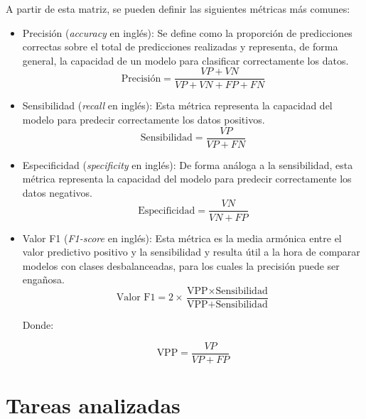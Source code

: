 A partir de esta matriz, se pueden definir las siguientes métricas más comunes:

\begin{itemize}
	\item Precisión (\textit{accuracy} en inglés): Se define como la proporción de predicciones correctas sobre el total de predicciones realizadas
	      y representa, de forma general, la capacidad de un modelo para clasificar correctamente los datos.
	      \begin{equation}
		      \label{eq:accuracy}
		      \text{Precisión} = \frac{VP + VN}{VP + VN + FP + FN}
	      \end{equation}

	\item Sensibilidad (\textit{recall} en inglés): Esta métrica representa la capacidad del modelo para predecir correctamente los datos positivos.
	      \begin{equation}
		      \label{eq:recall}
		      \text{Sensibilidad} = \frac{VP}{VP + FN}
	      \end{equation}

	\item Especificidad (\textit{specificity} en inglés): De forma análoga a la sensibilidad, esta métrica representa la capacidad del
	      modelo para predecir correctamente los datos negativos.
	      \begin{equation}
		      \label{eq:specificity}
		      \text{Especificidad} = \frac{VN}{VN + FP}
	      \end{equation}

	\item Valor F1 (\textit{F1-score} en inglés): Esta métrica es la media armónica entre el valor predictivo positivo y la sensibilidad
	      y resulta útil a la hora de comparar modelos con clases desbalanceadas, para los cuales la precisión puede ser engañosa.
	      \begin{equation}
		      \label{eq:f1}
		      \text{Valor F1} = 2 \times \frac{\text{VPP} \times \text{Sensibilidad}}{\text{VPP} + \text{Sensibilidad}}
	      \end{equation}

				Donde:

				\begin{equation}
					\label{eq:vpp}
					\text{VPP} = \frac{VP}{VP + FP}
				\end{equation}
\end{itemize}

\section{Tareas analizadas}
\label{sec:competiciones_analizadas}

